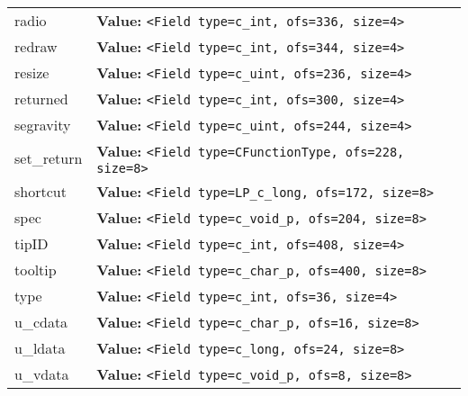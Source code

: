 \begin{longtable}{|p{\varnamewidth}|p{\vardescrwidth}|l}
\cline{1-2}
\raggedright r\-a\-d\-i\-o\- & \raggedright \textbf{Value:} 
{\tt {\textless}Field type=c\_int, ofs=336, size=4{\textgreater}}&\\
\cline{1-2}
\raggedright r\-e\-d\-r\-a\-w\- & \raggedright \textbf{Value:} 
{\tt {\textless}Field type=c\_int, ofs=344, size=4{\textgreater}}&\\
\cline{1-2}
\raggedright r\-e\-s\-i\-z\-e\- & \raggedright \textbf{Value:} 
{\tt {\textless}Field type=c\_uint, ofs=236, size=4{\textgreater}}&\\
\cline{1-2}
\raggedright r\-e\-t\-u\-r\-n\-e\-d\- & \raggedright \textbf{Value:} 
{\tt {\textless}Field type=c\_int, ofs=300, size=4{\textgreater}}&\\
\cline{1-2}
\raggedright s\-e\-g\-r\-a\-v\-i\-t\-y\- & \raggedright \textbf{Value:} 
{\tt {\textless}Field type=c\_uint, ofs=244, size=4{\textgreater}}&\\
\cline{1-2}
\raggedright s\-e\-t\-\_\-r\-e\-t\-u\-r\-n\- & \raggedright \textbf{Value:} 
{\tt {\textless}Field type=CFunctionType, ofs=228, size=8{\textgreater}}&\\
\cline{1-2}
\raggedright s\-h\-o\-r\-t\-c\-u\-t\- & \raggedright \textbf{Value:} 
{\tt {\textless}Field type=LP\_c\_long, ofs=172, size=8{\textgreater}}&\\
\cline{1-2}
\raggedright s\-p\-e\-c\- & \raggedright \textbf{Value:} 
{\tt {\textless}Field type=c\_void\_p, ofs=204, size=8{\textgreater}}&\\
\cline{1-2}
\raggedright t\-i\-p\-I\-D\- & \raggedright \textbf{Value:} 
{\tt {\textless}Field type=c\_int, ofs=408, size=4{\textgreater}}&\\
\cline{1-2}
\raggedright t\-o\-o\-l\-t\-i\-p\- & \raggedright \textbf{Value:} 
{\tt {\textless}Field type=c\_char\_p, ofs=400, size=8{\textgreater}}&\\
\cline{1-2}
\raggedright t\-y\-p\-e\- & \raggedright \textbf{Value:} 
{\tt {\textless}Field type=c\_int, ofs=36, size=4{\textgreater}}&\\
\cline{1-2}
\raggedright u\-\_\-c\-d\-a\-t\-a\- & \raggedright \textbf{Value:} 
{\tt {\textless}Field type=c\_char\_p, ofs=16, size=8{\textgreater}}&\\
\cline{1-2}
\raggedright u\-\_\-l\-d\-a\-t\-a\- & \raggedright \textbf{Value:} 
{\tt {\textless}Field type=c\_long, ofs=24, size=8{\textgreater}}&\\
\cline{1-2}
\raggedright u\-\_\-v\-d\-a\-t\-a\- & \raggedright \textbf{Value:} 
{\tt {\textless}Field type=c\_void\_p, ofs=8, size=8{\textgreater}}&\\

\end{longtable}
